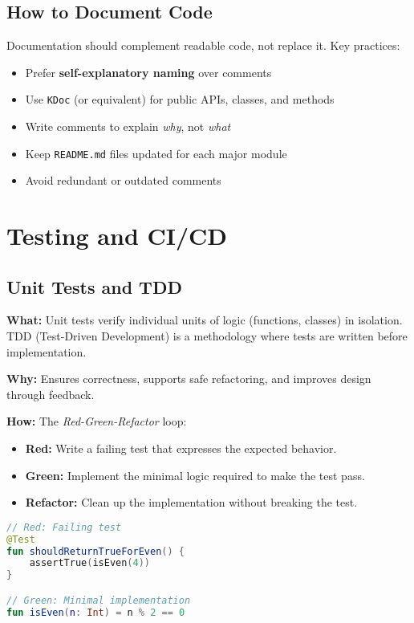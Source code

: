 \documentclass[a4paper,12pt]{article}
\begin{document}
\subsection{How to Document Code}

Documentation should complement readable code, not replace it. Key practices:

\begin{itemize}
  \item Prefer \textbf{self-explanatory naming} over comments
  \item Use \texttt{KDoc} (or equivalent) for public APIs, classes, and methods
  \item Write comments to explain \textit{why}, not \textit{what}
  \item Keep \texttt{README.md} files updated for each major module
  \item Avoid redundant or outdated comments
\end{itemize}


\section{Testing and CI/CD}

\subsection{Unit Tests and TDD}

\textbf{What:} Unit tests verify individual units of logic (functions, classes) in isolation. TDD (Test-Driven Development) is a methodology where tests are written before implementation.

\textbf{Why:} Ensures correctness, supports safe refactoring, and improves design through feedback.

\textbf{How:} The \textit{Red-Green-Refactor} loop:

\begin{itemize}
  \item \textbf{Red:} Write a failing test that expresses the expected behavior.
  \item \textbf{Green:} Implement the minimal logic required to make the test pass.
  \item \textbf{Refactor:} Clean up the implementation without breaking the test.
\end{itemize}

\begin{lstlisting}[language=Kotlin]
// Red: Failing test
@Test
fun shouldReturnTrueForEven() {
    assertTrue(isEven(4))
}

// Green: Minimal implementation
fun isEven(n: Int) = n % 2 == 0
\end{lstlisting}
\end{document}
